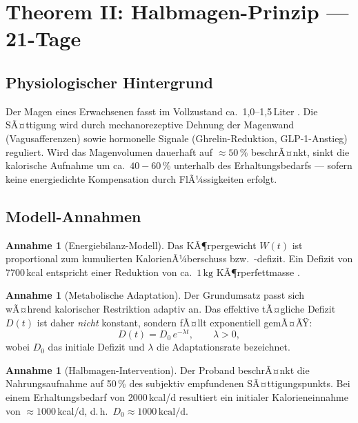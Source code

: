 ﻿\documentclass[12pt,a4paper]{article}
\theoremstyle{plain}
\theoremstyle{definition}
\newtheorem{assumption}[theorem]{Annahme}
\theoremstyle{remark}
\begin{document}
\section{Theorem II: Halbmagen-Prinzip --- 21-Tage}
\label{sec:diet}

\subsection{Physiologischer Hintergrund}

Der Magen eines Erwachsenen fasst im Vollzustand ca.\ 1{,}0--1{,}5\,Liter
\cite{Tortora2014}. Die SÃ¤ttigung wird durch mechanorezeptive Dehnung der
Magenwand (Vagusafferenzen) sowie hormonelle Signale (Ghrelin-Reduktion,
GLP-1-Anstieg) reguliert. Wird das Magenvolumen dauerhaft auf $\approx 50\,\%$
beschrÃ¤nkt, sinkt die kalorische Aufnahme um ca.\ $40-60\,\%$ unterhalb des
Erhaltungsbedarfs --- sofern keine energiedichte Kompensation durch FlÃ¼ssigkeiten
erfolgt.

\subsection{Modell-Annahmen}

\begin{assumption}[Energiebilanz-Modell]
\label{ass:energy}
Das KÃ¶rpergewicht $W(t)$ ist proportional zum kumulierten KalorienÃ¼berschuss
bzw.\ -defizit. Ein Defizit von 7700\,kcal entspricht einer Reduktion von
ca.\ $1\,\text{kg}$ KÃ¶rperfettmasse \cite{Hall2012}.
\end{assumption}

\begin{assumption}[Metabolische Adaptation]
\label{ass:metab}
Der Grundumsatz passt sich wÃ¤hrend kalorischer Restriktion adaptiv an. Das
effektive tÃ¤gliche Defizit $D(t)$ ist daher \emph{nicht} konstant, sondern
fÃ¤llt exponentiell gemÃ¤ÃŸ:
\begin{equation}
  D(t) = D_0 \, e^{-\lambda t}, \qquad \lambda > 0,
  \label{eq:deficit}
\end{equation}
wobei $D_0$ das initiale Defizit und $\lambda$ die Adaptationsrate bezeichnet.
\end{assumption}

\begin{assumption}[Halbmagen-Intervention]
\label{ass:half}
Der Proband beschrÃ¤nkt die Nahrungsaufnahme auf 50\,\% des subjektiv
empfundenen SÃ¤ttigungspunkts. Bei einem Erhaltungsbedarf von 2000\,kcal/d
resultiert ein initialer Kalorieneinnahme von $\approx 1000$\,kcal/d,
d.\,h.\ $D_0 \approx 1000\,\text{kcal/d}$.
\end{assumption}
\end{document}
